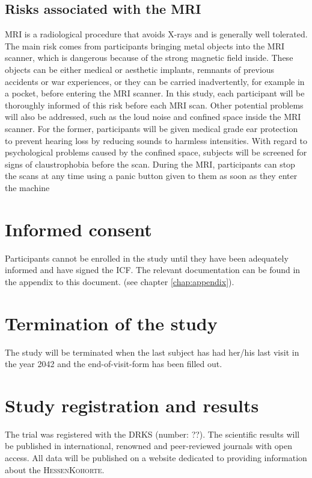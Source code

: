 \subsection{Risks associated with the \ac{MRI}}
\ac{MRI} is a radiological procedure that avoids X-rays and is generally well tolerated. The main risk comes from participants bringing metal objects into the \ac{MRI} scanner, which is dangerous because of the strong magnetic field inside. These objects can be either medical or aesthetic implants, remnants of previous accidents or war experiences, or they can be carried inadvertently, for example in a pocket, before entering the \ac{MRI} scanner. In this study, each participant will be thoroughly informed of this risk before each \ac{MRI} scan. Other potential problems will also be addressed, such as the loud noise and confined space inside the \ac{MRI} scanner. For the former, participants will be given medical grade ear protection to prevent hearing loss by reducing sounds to harmless intensities. With regard to psychological problems caused by the confined space, subjects will be screened for signs of claustrophobia before the scan. During the \ac{MRI}, participants can stop the scans at any time using a panic button given to them as soon as they enter the machine

\section{Informed consent}
Participants cannot be enrolled in the study until they have been adequately informed and have signed the \ac{ICF}. The relevant documentation can be found in the appendix to this document. (see chapter \ref{chap:appendix}).

\section{Termination of the study}
The study will be terminated when the last subject has had her/his last visit in the year 2042 and the end-of-visit-form has been filled out.

\section{Study registration and results}
The trial was registered with the \ac{DRKS} (number: ??). The scientific results will be published in international, renowned and peer-reviewed journals with open access. All data will be published on a website dedicated to providing information about the \textsc{HessenKohorte}.


